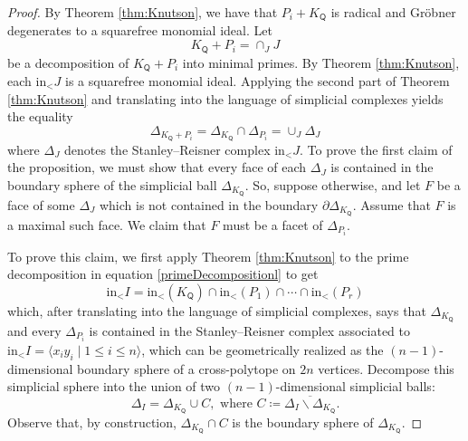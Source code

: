 \documentclass[ALCO,published]{cedram}
\numberwithin{equation}{section}
\newcommand{\1}{^{-1}}
\def\Q{\mathsf{Q}}
\begin{document}
\begin{proof}
By Theorem \ref{thm:Knutson}, we have that $P_i+K_\Q$ is radical and Gr\"obner degenerates to a squarefree monomial ideal. Let 
\[
K_\Q+P_i = \cap_J J
\]
be a decomposition of $K_\Q+P_i$ into minimal primes. By Theorem \ref{thm:Knutson}, each $\textrm{in}_< J$ is a squarefree monomial ideal. Applying the second part of Theorem \ref{thm:Knutson} and translating into the language of simplicial complexes yields the equality
\[
\Delta_{K_\Q+P_i} = \Delta_{K_\Q}\cap \Delta_{P_i} = \cup_J \Delta_J
\]
where  $\Delta_J$ denotes the Stanley--Reisner complex $\textrm{in}_< J$. To prove the first claim of the proposition, we must show that every face of each $\Delta_J$ is contained in the boundary sphere of the simplicial ball $\Delta_{K_\Q}$. 
So, suppose otherwise, and let $F$ be a face of some $\Delta_J$ which is not contained in the boundary $\partial \Delta_{K_\Q}$. Assume that $F$ is a maximal such face. We claim that $F$ must be a facet of $\Delta_{P_i}$.  %

To prove this claim, we first apply Theorem \ref{thm:Knutson} to the prime decomposition in equation \eqref{primeDecompositionl} to get
\begin{equation}\label{eq:simplicialEquality}
\textrm{in}_< I = \textrm{in}_< (K_\Q)\cap \textrm{in}_<(P_1)\cap\cdots \cap \textrm{in}_<(P_r)
\end{equation}
which, after translating into the language of simplicial complexes, says that $\Delta_{K_\Q}$ and every $\Delta_{P_i}$ is contained in the Stanley--Reisner complex associated to $\textrm{in}_< I = \langle x_iy_i \mid 1\leq i\leq n \rangle$, which can be geometrically realized as the $(n-1)$-dimensional boundary sphere of a cross-polytope on $2n$ vertices. Decompose this simplicial sphere into the union of two $(n-1)$-dimensional simplicial balls:
\[
\Delta_I = \Delta_{K_\Q}\cup C, \textrm{  where  } C \coloneqq \overline{\Delta_I\smallsetminus \Delta_{K_\Q}}.
\]
Observe that, by construction, $\Delta_{K_\Q}\cap C$ is the boundary sphere of $\Delta_{K_\Q}$.


\end{proof}
\end{document}
